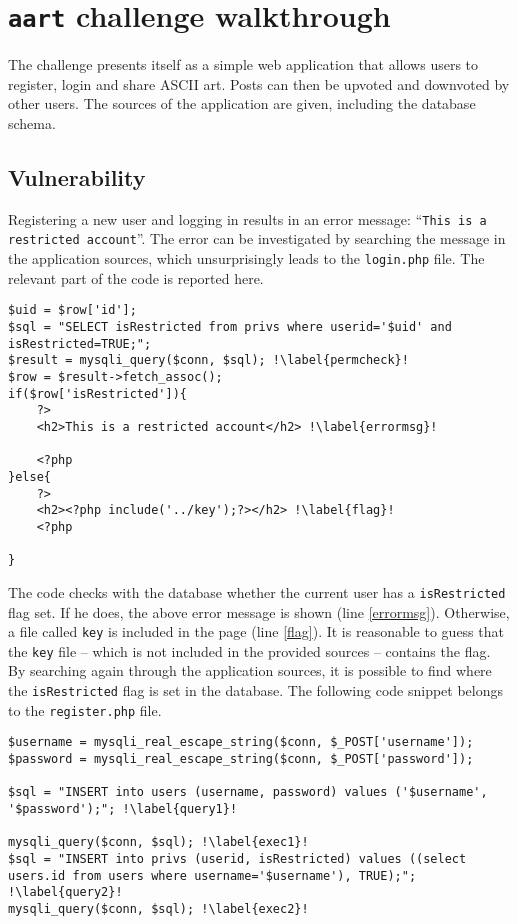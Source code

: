 \section{\texttt{aart} challenge walkthrough}

The challenge presents itself as a simple web application that allows users to register, login and share ASCII art. Posts can then be upvoted and downvoted by other users. The sources of the application are given, including the database schema. \\

\subsection{Vulnerability}
 
Registering a new user and logging in results in an error message: ``\texttt{This is a restricted account}''. The error can be investigated by searching the message in the application sources, which unsurprisingly leads to the \texttt{login.php} file. The relevant part of the code is reported here.

\begin{verbatim}
$uid = $row['id'];
$sql = "SELECT isRestricted from privs where userid='$uid' and isRestricted=TRUE;";
$result = mysqli_query($conn, $sql); !\label{permcheck}!
$row = $result->fetch_assoc();
if($row['isRestricted']){
    ?>
    <h2>This is a restricted account</h2> !\label{errormsg}!

    <?php
}else{
    ?>
    <h2><?php include('../key');?></h2> !\label{flag}!
    <?php

}
\end{verbatim}

The code checks with the database whether the current user has a \texttt{isRestricted} flag set. If he does, the above error message is shown (line \ref{errormsg}). Otherwise, a file called \texttt{key} is included in the page (line \ref{flag}). It is reasonable to guess that the \texttt{key} file -- which is not included in the provided sources -- contains the flag. \\

By searching again through the application sources, it is possible to find where the \texttt{isRestricted} flag is set in the database. The following code snippet belongs to the \texttt{register.php} file.

\begin{verbatim}
$username = mysqli_real_escape_string($conn, $_POST['username']);
$password = mysqli_real_escape_string($conn, $_POST['password']);

$sql = "INSERT into users (username, password) values ('$username', '$password');"; !\label{query1}!

mysqli_query($conn, $sql); !\label{exec1}!
$sql = "INSERT into privs (userid, isRestricted) values ((select users.id from users where username='$username'), TRUE);"; !\label{query2}!
mysqli_query($conn, $sql); !\label{exec2}!
\end{verbatim}

